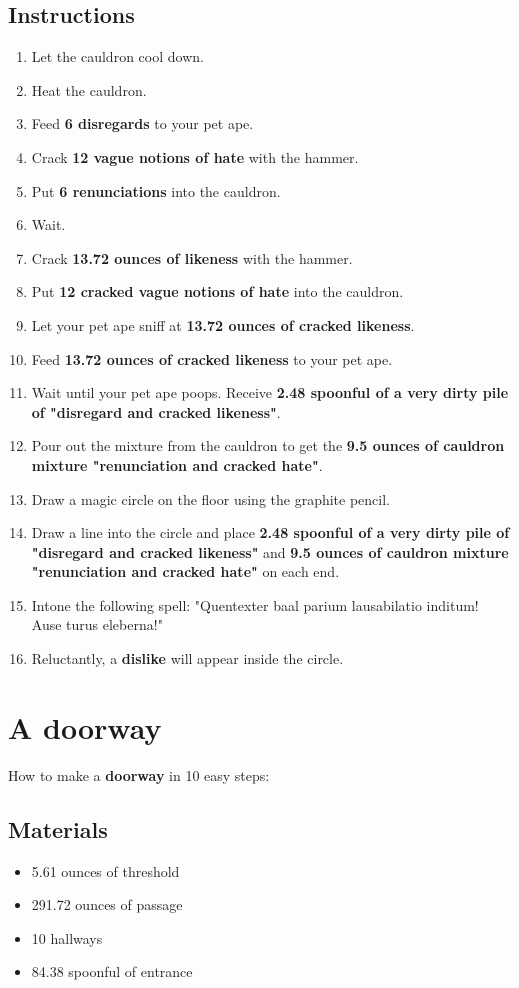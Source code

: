 \documentclass{article}
\begin{document}
\subsection{Instructions}\begin{enumerate}
\item 
Let the cauldron cool down.
\item 
Heat the cauldron.
\item 
Feed \textbf{6 disregards} to your pet ape.
\item 
Crack \textbf{12 vague notions of hate} with the hammer.
\item 
Put \textbf{6 renunciations} into the cauldron.
\item 
Wait.
\item 
Crack \textbf{13.72 ounces of likeness} with the hammer.
\item 
Put \textbf{12 cracked vague notions of hate} into the cauldron.
\item 
Let your pet ape sniff at \textbf{13.72 ounces of cracked likeness}.
\item 
Feed \textbf{13.72 ounces of cracked likeness} to your pet ape.
\item 
Wait until your pet ape poops. Receive \textbf{2.48 spoonful of a very dirty pile of "disregard and cracked likeness"}.
\item 
Pour out the mixture from the cauldron to get the \textbf{9.5 ounces of cauldron mixture "renunciation and cracked hate"}.
\item 
Draw a magic circle on the floor using the graphite pencil.
\item 
Draw a line into the circle and place \textbf{2.48 spoonful of a very dirty pile of "disregard and cracked likeness"} and \textbf{9.5 ounces of cauldron mixture "renunciation and cracked hate"} on each end.
\item 
Intone the following spell: "Quentexter baal parium lausabilatio inditum! Ause turus eleberna!"
\item 
Reluctantly, a \textbf{dislike} will appear inside the circle.
\end{enumerate}
\newpage
\section{A doorway}How to make a \textbf{doorway} in 10 easy steps:

\subsection{Materials}\begin{itemize}
\item 
5.61 ounces of threshold
\item 
291.72 ounces of passage
\item 
10 hallways
\item 
84.38 spoonful of entrance
\end{itemize}
\end{document}
